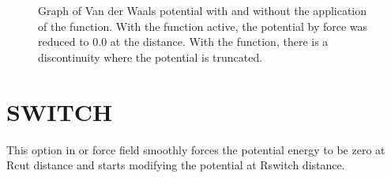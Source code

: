 \documentclass[letterpaper,10pt,english]{sphinxmanual}
\begin{document}
\begin{description}
\begin{figure}[htbp]
\noindent{}
\caption{Graph of Van der Waals potential with and without the application of the  function. With the  function active, the potential by force was reduced to 0.0 at the  distance. With the  function, there is a discontinuity where the potential is truncated.}\label{\detokenize{vdw_energy:id2}}\end{figure}

\end{description}


\section{SWITCH}
\label{\detokenize{vdw_energy:switch}}
\sphinxAtStartPar
This option in  or  force field smoothly forces the potential energy to be zero at Rcut distance and starts modifying the potential at Rswitch distance.
\end{document}
